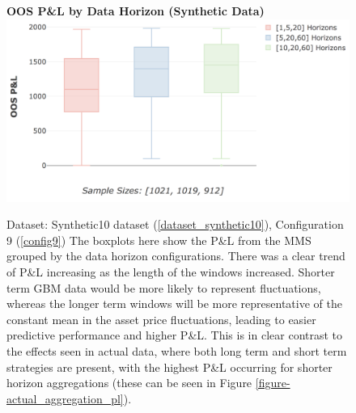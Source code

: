 \documentclass[a4paper,11pt,oneside]{article}
\theoremstyle{plain}
\theoremstyle{definition}
\begin{document}
	\begin{figure}[H]
		\centering 
		\textbf{OOS P\&L by Data Horizon (Synthetic Data)}
		\includegraphics[scale=0.36]{images/results/8_5_synthetic_data/test_aggregation_pl.png}
		\caption[OOS P\&L by Data Aggregation for Synthetic Data]{
			Dataset: Synthetic10 dataset (\ref{dataset_synthetic10}), Configuration 9 (\ref{config9})
			\newline  The boxplots here show the P\&L from the MMS grouped by the data horizon configurations. There was a clear trend of P\&L increasing as the length of the windows increased. Shorter term GBM data would be more likely to represent fluctuations, whereas the longer term windows will be more representative of the constant mean in the asset price fluctuations, leading to easier predictive performance and higher P\&L. This is in clear contrast to the effects seen in actual data, where both long term and short term strategies are present, with the highest P\&L occurring for shorter horizon aggregations (these can be seen in Figure \ref{figure-actual_aggregation_pl}).}
		\label{figure-test_aggregation_pl}
	\end{figure}
	
\end{document}

